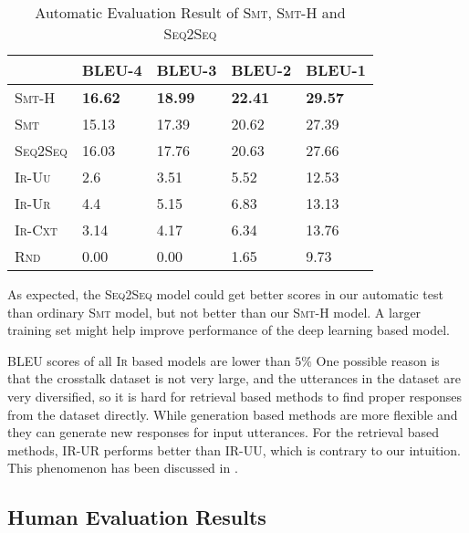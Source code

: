 \documentclass[letterpaper]{article} %
\begin{document}
\begin{CJK*}{UTF8}{gbsn}
\begin{table}[htb]
\begin{tabular}{lllll}
\toprule
 & BLEU-4 & BLEU-3 & BLEU-2 & BLEU-1 \\
 \midrule
\textsc{Smt-H} & \textbf{16.62} & \textbf{18.99} & \textbf{22.41} & \textbf{29.57} \\
\textsc{Smt} & 15.13 & 17.39 & 20.62 & 27.39 \\
\textsc{Seq2Seq} & 16.03 & 17.76 & 20.63 & 27.66 \\
\textsc{Ir-Uu} & 2.6 & 3.51 & 5.52 & 12.53 \\
\textsc{Ir-Ur} & 4.4 & 5.15 & 6.83 & 13.13 \\
\textsc{Ir-Cxt} & 3.14 & 4.17 & 6.34 & 13.76 \\
\textsc{Rnd} & 0.00 & 0.00 & 1.65 & 9.73 \\
\bottomrule
\end{tabular}
	\caption{Automatic Evaluation Result of \textsc{Smt}, \textsc{Smt-H} and \textsc{Seq2Seq}}
	\label{res-auto}
\end{table} 
As expected, the \textsc{Seq2Seq} model could get better scores in our automatic test than ordinary \textsc{Smt} model, but not better than our \textsc{Smt-H} model. A larger training set might help improve performance of the deep learning based model.
	
BLEU scores of all \textsc{Ir} based models are lower than $5\%$ 
 One possible reason is that the crosstalk dataset is not very large, and the utterances in the dataset are very diversified, so it is hard for retrieval based methods to find proper responses from the dataset directly. While generation based methods are more flexible and they can generate new responses for input utterances. For the retrieval based methods, IR-UR performs better than IR-UU, which is contrary to our intuition. This phenomenon has been discussed in \cite{ritter2011data}.


\subsection{Human Evaluation Results}


\end{CJK*}
\end{document}

